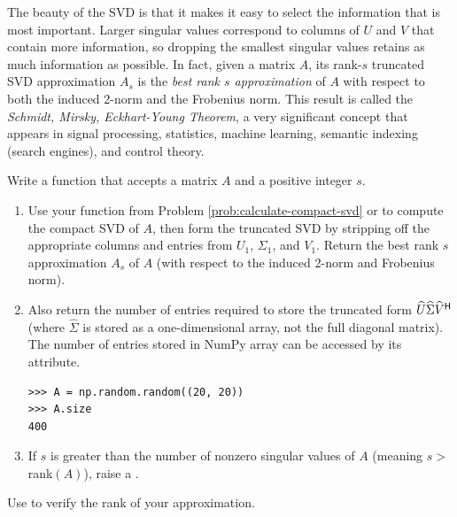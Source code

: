 The beauty of the SVD is that it makes it easy to select the information that is most important.
Larger singular values correspond to columns of $U$ and $V$ that contain more information, so dropping the smallest singular values retains as much information as possible.
In fact, given a matrix $A$, its rank-$s$ truncated SVD approximation $A_s$ is the \emph{best rank $s$ approximation} of $A$ with respect to both the induced 2-norm and the Frobenius norm.
This result is called the \emph{Schmidt, Mirsky, Eckhart-Young Theorem}, a very significant concept that appears in signal processing, statistics, machine learning, semantic indexing (search engines), and control theory.

\begin{problem} %
Write a function that accepts a matrix $A$ and a positive integer $s$.
\begin{enumerate}
\item Use your function from Problem \ref{prob:calculate-compact-svd} or  to compute the compact SVD of $A$, then form the truncated SVD by stripping off the appropriate columns and entries from $U_1$, $\Sigma_1$, and $V_1$.
Return the best rank $s$ approximation $A_s$ of $A$ (with respect to the induced 2-norm and Frobenius norm).
\item Also return the number of entries required to store the truncated form $\widehat{U}\widehat{\Sigma} \widehat{V}^{\mathsf H}$ (where $\widehat{\Sigma}$ is stored as a one-dimensional array, not the full diagonal matrix).
The number of entries stored in NumPy array can be accessed by its  attribute.
\begin{lstlisting}
>>> A = np.random.random((20, 20))
>>> A.size
400
\end{lstlisting}
\item If $s$ is greater than the number of nonzero singular values of $A$ (meaning $s > $ rank$(A)$), raise a .
\end{enumerate}
Use  to verify the rank of your approximation.
\label{prob:svd_approx}
\end{problem}

